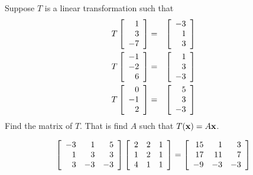 \begin{enumialphparenastyle}
\begin{ex} Suppose $T$ is a linear transformation such that 
\begin{eqnarray*}
T\left[
\begin{array}{r}
1 \\
3 \\
-7
\end{array}
\right] &=&\left[
\begin{array}{r}
-3 \\
1 \\
3
\end{array}
\right] \\
T\left[
\begin{array}{r}
-1 \\
-2 \\
6
\end{array}
\right] &=&\left[
\begin{array}{r}
1 \\
3 \\
-3
\end{array}
\right] \\
T\left[
\begin{array}{r}
0 \\
-1 \\
2
\end{array}
\right] &=&\left[
\begin{array}{r}
5 \\
3 \\
-3
\end{array}
\right]
\end{eqnarray*}
Find the matrix of $T$. That is find $A$ such that $T({\bf x})=A{\bf x}$. \vspace{1mm}\vspace{1mm}
\begin{sol}
\[
\left[
\begin{array}{rrr}
-3 & 1 & 5 \\
1 & 3 & 3 \\
3 & -3 & -3
\end{array}
\right] \left[
\begin{array}{ccc}
2 & 2 & 1 \\
1 & 2 & 1 \\
4 & 1 & 1
\end{array}
\right] = \left[
\begin{array}{rrr}
15 & 1 & 3 \\
17 & 11 & 7 \\
-9 & -3 & -3
\end{array}
\right]
\]
\end{sol}
\end{ex}


\end{enumialphparenastyle}
